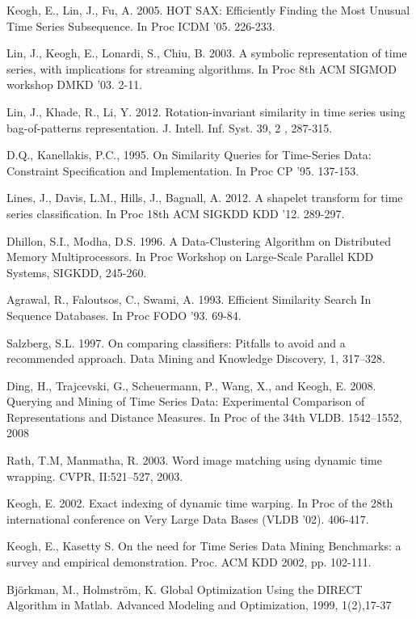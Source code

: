 \documentclass{llncs}
\begin{document}
\begin{thebibliography}{5}
Keogh, E., Lin, J., Fu, A. 2005.
HOT SAX: Efficiently Finding the Most Unusual Time Series Subsequence. 
In Proc ICDM '05. 226-233.

Lin, J., Keogh, E., Lonardi, S., Chiu, B. 2003.
A symbolic representation of time series, with implications for streaming algorithms. 
In Proc 8th ACM SIGMOD workshop DMKD '03. 2-11.

Lin, J., Khade, R., Li, Y. 2012.
Rotation-invariant similarity in time series using bag-of-patterns representation. 
J. Intell. Inf. Syst. 39, 2 , 287-315.

D.Q., Kanellakis, P.C., 1995.
On Similarity Queries for Time-Series Data: Constraint Specification and Implementation. 
In Proc CP '95. 137-153.

Lines, J., Davis, L.M., Hills, J., Bagnall, A. 2012.
A shapelet transform for time series classification. 
In Proc 18th ACM SIGKDD KDD '12. 289-297.

Dhillon, S.I., Modha, D.S. 1996.
A Data-Clustering Algorithm on Distributed Memory Multiprocessors. 
In Proc Workshop on Large-Scale Parallel KDD Systems, SIGKDD, 245-260.

Agrawal, R., Faloutsos, C., Swami, A. 1993.
Efficient Similarity Search In Sequence Databases.
In Proc FODO '93. 69-84.

Salzberg, S.L. 1997.
On comparing classifiers: Pitfalls to avoid and a recommended approach. 
Data Mining and Knowledge Discovery, 1, 317–328.

Ding, H., Trajcevski, G., Scheuermann, P., Wang, X., and Keogh, E. 2008.
Querying and Mining of Time Series Data: Experimental Comparison of Representations and Distance
Measures. 
In Proc of the 34th VLDB. 1542–1552, 2008

Rath, T.M, Manmatha, R. 2003.
Word image matching using dynamic time wrapping. 
CVPR, II:521–527, 2003.

Keogh, E. 2002. 
Exact indexing of dynamic time warping. 
In Proc of the 28th international conference on Very Large Data Bases (VLDB '02). 406-417.

Keogh, E., Kasetty S. 
On the need for Time Series Data Mining Benchmarks: a survey and empirical demonstration.
Proc. ACM KDD 2002, pp. 102-111.

Björkman, M., Holmström, K.
Global Optimization Using the DIRECT Algorithm in Matlab.
Advanced Modeling and Optimization, 1999, 1(2),17-37


\end{thebibliography}
\end{document}
